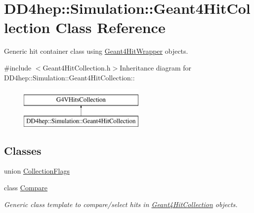 \hypertarget{class_d_d4hep_1_1_simulation_1_1_geant4_hit_collection}{
\section{DD4hep::Simulation::Geant4HitCollection Class Reference}
\label{class_d_d4hep_1_1_simulation_1_1_geant4_hit_collection}
}


Generic hit container class using \hyperlink{class_d_d4hep_1_1_simulation_1_1_geant4_hit_wrapper}{Geant4HitWrapper} objects.  


{\ttfamily \#include $<$Geant4HitCollection.h$>$}Inheritance diagram for DD4hep::Simulation::Geant4HitCollection::\begin{figure}[H]
\begin{center}
\leavevmode
\includegraphics[height=2cm]{class_d_d4hep_1_1_simulation_1_1_geant4_hit_collection}
\end{center}
\end{figure}
\subsection*{Classes}
\begin{DoxyCompactItemize}
\item 
union \hyperlink{union_d_d4hep_1_1_simulation_1_1_geant4_hit_collection_1_1_collection_flags}{CollectionFlags}
\item 
class \hyperlink{class_d_d4hep_1_1_simulation_1_1_geant4_hit_collection_1_1_compare}{Compare}
\begin{DoxyCompactList}\small\item\em Generic class template to compare/select hits in \hyperlink{class_d_d4hep_1_1_simulation_1_1_geant4_hit_collection}{Geant4HitCollection} objects. \item\end{DoxyCompactList}\end{DoxyCompactItemize}
